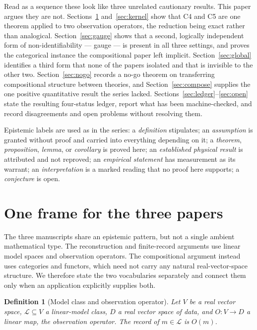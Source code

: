 \documentclass[11pt]{article}
\newtheorem{definition}{Definition}[section]
\theoremstyle{definition}
\begin{document}
Read as a sequence these look like three unrelated cautionary results. This
paper argues they are not. Sections~\ref{sec:frame} and~\ref{sec:kernel} show
that C4 and C5 are one theorem applied to two observation operators, the
reduction being exact rather than analogical. Section~\ref{sec:gauge} shows that
a second, logically independent form of non-identifiability --- gauge --- is
present in all three settings, and proves the categorical instance the
compositional paper left implicit. Section~\ref{sec:global} identifies a third
form that none of the papers isolated and that is invisible to the other two.
Section~\ref{sec:nogo} records a no-go theorem on transferring compositional
structure between theories, and Section~\ref{sec:compose} supplies the one
positive quantitative result the series lacked.
Sections~\ref{sec:ledger}--\ref{sec:open} state the resulting four-status
ledger, report what has been machine-checked, and record disagreements and open
problems without resolving them.

Epistemic labels are used as in the series: a \emph{definition} stipulates; an
\emph{assumption} is granted without proof and carried into everything depending
on it; a \emph{theorem}, \emph{proposition}, \emph{lemma}, or \emph{corollary}
is proved here; an \emph{established physical result} is attributed and not
reproved; an \emph{empirical statement} has measurement as its warrant; an
\emph{interpretation} is a marked reading that no proof here supports; a
\emph{conjecture} is open.

\section{One frame for the three papers}
\label{sec:frame}

The three manuscripts share an epistemic pattern, but not a single ambient
mathematical type. The reconstruction and finite-record arguments use linear
model spaces and observation operators. The compositional argument instead
uses categories and functors, which need not carry any natural real-vector-space
structure. We therefore state the two vocabularies separately and connect them
only when an application explicitly supplies both.

\begin{definition}[Model class and observation operator]
\label{def:obs}
Let $V$ be a real vector space, $\mathcal L\subseteq V$ a \emph{linear-model class},
$D$ a real vector space of \emph{data}, and $O:V\to D$ a linear map, the
\emph{observation operator}. The \emph{record} of $m\in\mathcal L$ is $O(m)$.
\end{definition}
\end{document}
